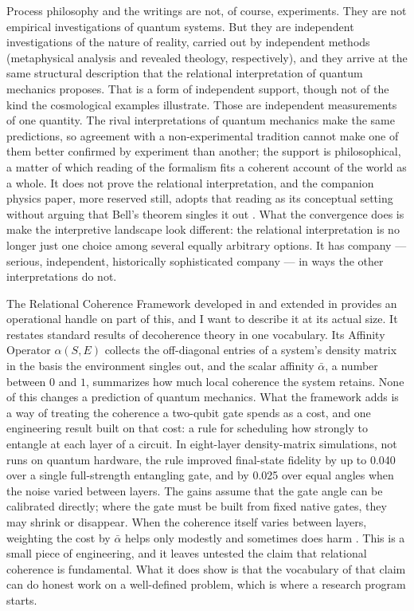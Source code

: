 Process philosophy and the \bahai writings are not, of course, experiments.  They
are not empirical investigations of quantum systems.  But they are independent
investigations of the nature of reality, carried out by independent methods
(metaphysical analysis and revealed theology, respectively), and they arrive at
the same structural description that the relational interpretation of quantum
mechanics proposes.  That is a form of independent support, though not of the
kind the cosmological examples illustrate.  Those are independent measurements
of one quantity.  The rival interpretations of quantum mechanics make the same
predictions, so agreement with a non-experimental tradition cannot make one of
them better confirmed by experiment than another; the support is
philosophical, a matter of which reading of the formalism fits a coherent
account of the world as a whole.  It does not prove the relational
interpretation, and the companion physics paper, more reserved still, adopts
that reading as its conceptual setting without arguing that Bell's theorem
singles it out \citep{AdamsRCT}.  What the convergence does is make the
interpretive landscape
look different: the relational interpretation is no longer just one choice among
several equally arbitrary options.  It has company --- serious, independent,
historically sophisticated company --- in ways the other interpretations do not.

The Relational Coherence Framework developed in \citet{AdamsRCT} and extended
in \citet{AdamsThreePaths} provides an operational handle on part of this, and
I want to describe it at its actual size.  It restates standard results of
decoherence theory in one vocabulary.  Its Affinity Operator $\alpha(S,E)$
collects the off-diagonal entries of a system's density matrix in the basis the
environment singles out, and the scalar affinity $\bar{\alpha}$, a number
between $0$ and $1$, summarizes how much local coherence the system retains.
None of this changes a prediction of quantum mechanics.  What the framework
adds is a way of treating the coherence a two-qubit gate spends as a cost, and
one engineering result built on that cost: a rule for scheduling how strongly
to entangle at each layer of a circuit.  In eight-layer density-matrix
simulations, not runs on quantum hardware, the rule improved final-state
fidelity by up to 0.040 over a single full-strength entangling gate, and by
0.025 over equal angles when the noise varied between layers.  The gains assume
that the gate angle can be calibrated directly; where the gate must be built
from fixed native gates, they may shrink or disappear.  When the coherence
itself varies between layers, weighting the cost by $\bar{\alpha}$ helps only
modestly and sometimes does harm \citep{AdamsRCT}.  This is a small piece of
engineering, and it leaves untested the claim that relational coherence is
fundamental.  What it does show is that the vocabulary of that claim can do
honest work on a well-defined problem, which is where a research program
starts.

